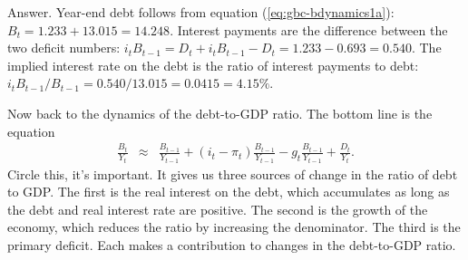 Answer.
Year-end debt follows from equation (\ref{eq:gbc-bdynamics1a}):
$B_t = 1.233 + 13.015 = 14.248$.
Interest payments are the difference between the two deficit numbers:
$ i_t B_{t-1} = D_t + i_t B_{t-1} - D_t = 1.233 - 0.693 = 0.540 $.
The implied interest rate on the debt is
the ratio of interest payments to debt:
$ i_t B_{t-1}/B_{t-1} = 0.540/13.015 = 0.0415 = 4.15\%$.


Now back to the dynamics of the debt-to-GDP ratio.
The bottom line is the equation
\begin{eqnarray}
    \frac{B_{t}}{Y_{t}}
            &\approx&
                \frac{B_{t-1}}{Y_{t-1}} + (i_t-\pi_t) \frac{B_{t-1}}{Y_{t-1}}
                - g_t \frac{B_{t-1}}{Y_{t-1}}
             +    \frac{D_{t}}{Y_{t}}  .
    \label{eq:debtdynamics}
\end{eqnarray}
Circle this, it's important.
It gives us three sources
of change in the ratio of debt to GDP.
The first is the real interest on the debt, which accumulates
as long as the debt and real interest rate are positive.
The second is the growth of the economy,
which reduces the ratio by increasing the denominator.
The third is the primary deficit.
Each makes a contribution to changes in the debt-to-GDP ratio.


